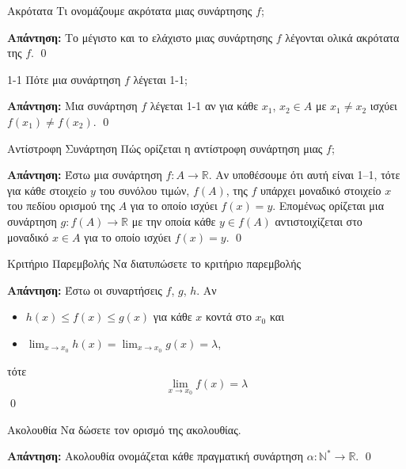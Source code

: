 \documentclass[a4paper, 12pt]{article}
\renewenvironment{proof}[1][\textbf{Απάντηση}]{%
  \par\noindent\textbf{#1:} \rmfamily}{\qed\par}
\begin{document}
\begin{theorem}{Ακρότατα}
  Τι ονομάζουμε ακρότατα μιας συνάρτησης $f$;
\end{theorem}
\begin{proof}
  Το μέγιστο και το ελάχιστο μιας συνάρτησης $f$ λέγονται ολικά ακρότατα της $f$.
\end{proof}

\begin{theorem}{1-1}
  Πότε μια συνάρτηση $f$ λέγεται 1-1;
\end{theorem}
\begin{proof}
  Μια συνάρτηση $f$ λέγεται 1-1 αν για κάθε $x_1$, $x_2 \in A$ με $x_1 \neq x_2$ ισχύει $f(x_1) \neq f(x_2)$.
\end{proof}

\begin{theorem}{Αντίστροφη Συνάρτηση}
  Πώς ορίζεται η αντίστροφη συνάρτηση μιας $f$;
\end{theorem}
\begin{proof}
  Έστω μια συνάρτηση $f : A \to \mathbb{R}$. Αν υποθέσουμε ότι αυτή είναι 1–1, τότε για κάθε στοιχείο $y$ του συνόλου τιμών, $f(A)$, της $f$ υπάρχει μοναδικό στοιχείο $x$ του πεδίου ορισμού της $Α$ για το οποίο ισχύει $f(x) = y$. Επομένως ορίζεται μια συνάρτηση
  $g : f ( A) \to \mathbb{R}$ με την οποία κάθε $y \in f ( A)$ αντιστοιχίζεται στο μοναδικό $x \in A$ για το οποίο ισχύει $f(x) = y$.
\end{proof}

\begin{theorem}{Κριτήριο Παρεμβολής}
  Να διατυπώσετε το κριτήριο παρεμβολής
\end{theorem}
\begin{proof}
  Έστω οι συναρτήσεις $f$, $g$, $h$. Αν
  \begin{itemize}
    \item $h(x) \leq f(x) \leq g(x)$ για κάθε $x$ κοντά στο $x_0$ και
    \item $\lim_{x \to x_0} h(x) = \lim_{x \to x_0} g(x) = λ$,
  \end{itemize}
  τότε
  $$\lim_{x \to x_0} f(x) = λ$$
\end{proof}

\begin{theorem}{Ακολουθία}
  Να δώσετε τον ορισμό της ακολουθίας.
\end{theorem}
\begin{proof}
  Ακολουθία ονομάζεται κάθε πραγματική συνάρτηση $α : \mathbb{N}^* \to \mathbb{R}$.
\end{proof}
\end{document}
